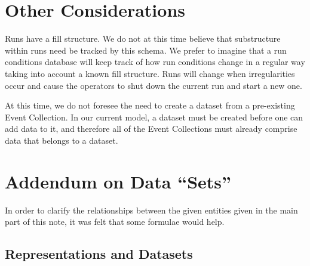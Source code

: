 \documentclass{cmspaper}
\begin{document}
\section{Other Considerations}

Runs have a fill structure.  We do not at this time believe that substructure within 
runs need be tracked by this schema.  We prefer to imagine that a run conditions 
database will keep track of how run conditions change in a regular way taking into 
account a known fill structure.  Runs will change when irregularities occur and cause 
the operators to shut down the current run and start a new one.  

At this time, we do not foresee the need to create a dataset from a 
pre-existing Event Collection.  In our current model, a dataset must be created 
before one can add data to it, and therefore all of the Event Collections must 
already comprise data that belongs to a dataset.  


\appendix

\section{Addendum on Data ``Sets''}\label{appendix}

In order to clarify the relationships between the given entities given in the main part of 
this note, it was felt that some formulae would help. 

\subsection{Representations and Datasets}
\end{document}
